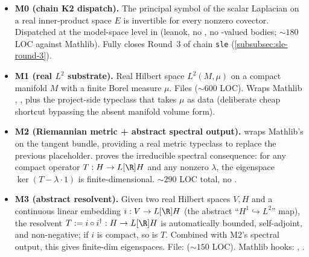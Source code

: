 \begin{itemize}
\item \textbf{M0 (chain K2 dispatch).}  The principal symbol of the
  scalar Laplacian on a real inner-product space $E$ is invertible
  for every nonzero covector.  Dispatched at the model-space level
  in 
  (\textsf{leanok}, no , no -valued bodies;
  $\sim 180$ LOC against Mathlib).  Fully closes Round~3 of chain
  \texttt{sle} (\ref{subsubsec:sle-round-3}).

\item \textbf{M1 (real $L^2$ substrate).}  Real Hilbert space
  $L^2(M, \mu)$ on a compact manifold $M$ with a finite Borel
  measure $\mu$.  Files
   ($\sim 600$ LOC).  Wraps Mathlib
  , , plus the
  project-side typeclass  that takes $\mu$
  as data (deliberate cheap shortcut bypassing the absent manifold
  volume form).

\item \textbf{M2 (Riemannian metric + abstract spectral output).}
   wraps Mathlib's
   on the tangent bundle, providing a real
  metric typeclass to replace the previous 
  placeholder.
  proves the irreducible spectral consequence: for any compact
  operator $T : H \to L[\R] H$ and any nonzero $\lambda$, the
  eigenspace $\ker(T - \lambda \cdot 1)$ is finite-dimensional.
  $\sim 290$ LOC total, no .

\item \textbf{M3 (abstract resolvent).}  Given two real Hilbert
  spaces $V, H$ and a continuous linear embedding $i : V \to L[\R] H$
  (the abstract ``$H^1 \hookrightarrow L^2$'' map), the resolvent
  $T := i \circ i^\dagger : H \to L[\R] H$ is automatically
  bounded, self-adjoint, and non-negative; if $i$ is compact, so is
  $T$.  Combined with M2's spectral output, this gives finite-dim
  eigenspaces.  File:
  ($\sim 150$ LOC).  Mathlib hooks: ,
  .


\end{itemize}
